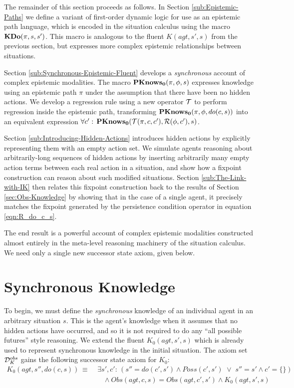 The remainder of this section proceeds as follows. In Section \ref{sub:Epistemic-Paths}
we define a variant of first-order dynamic logic for use as an epistemic
path language, which is encoded in the situation calculus using the
macro $\mathbf{KDo}(\pi,s,s')$. This macro is analogous to the fluent $K(agt,s',s)$
from the previous section, but expresses more complex epistemic relationships
between situations.

Section \ref{sub:Synchronous-Epistemic-Fluent} develops a \emph{synchronous}
account of complex epistemic modalities. The macro $\mathbf{PKnows_{0}}(\pi,\phi,s)$
expresses knowledge using an epistemic path $\pi$ under the assumption
that there have been no hidden actions. We develop a regression rule
using a new operator $\mathcal{T}$ to perform regression inside the epistemic
path, transforming $\mathbf{PKnows_{0}}(\pi,\phi,do(c,s))$ into an equivalent
expression $\forall c':\,\mathbf{PKnows_{0}}(\mathcal{T}(\pi,c,c'),\mathcal{R}(\phi,c'),s)$.

Section \ref{sub:Introducing-Hidden-Actions} introduces hidden actions
by explicitly representing them with an empty action set. We simulate
agents reasoning about arbitrarily-long sequences of hidden actions
by inserting arbitrarily many empty action terms between each real
action in a situation, and show how a fixpoint construction can reason
about such modified situations. Section \ref{sub:The-Link-with-IK}
then relates this fixpoint construction back to the results of Section
\ref{sec:Obs-Knowledge} by showing that in the case of a single agent,
it precisely matches the fixpoint generated by the persistence condition
operator in equation \eqref{eqn:R_do_c_s}.

The end result is a powerful account of complex epistemic modalities
constructed almost entirely in the meta-level reasoning machinery
of the situation calculus. We need only a single new successor state
axiom, given below.


\section{Synchronous Knowledge\label{sub:Syncrhonous-Knowledge}}

To begin, we must define the \emph{synchronous} knowledge of an individual
agent in an arbitrary situation $s$. This is the agent's knowledge
when it assumes that no hidden actions have occurred, and so it is
not required to do any {}``all possible futures'' style reasoning.
We extend the fluent $K_{0}(agt,s',s)$ which is already used to represent
synchronous knowledge in the initial situation. The axiom set $\mathcal{D}_{K}^{obs}$
gains the following successor state axiom for $K_{0}$:\begin{align}
K_{0}(agt,s'',do(c,s))\,\equiv\,\, & \exists s',c':\,\left(s''=do(c',s')\wedge Poss(c',s')\,\,\vee\,\, s''=s'\wedge c'=\{\}\right)\nonumber \\
 & \,\,\,\,\,\wedge Obs(agt,c,s)=Obs(agt,c',s')\wedge K_{0}(agt,s',s)\label{eq:K0_ssa}\end{align}


